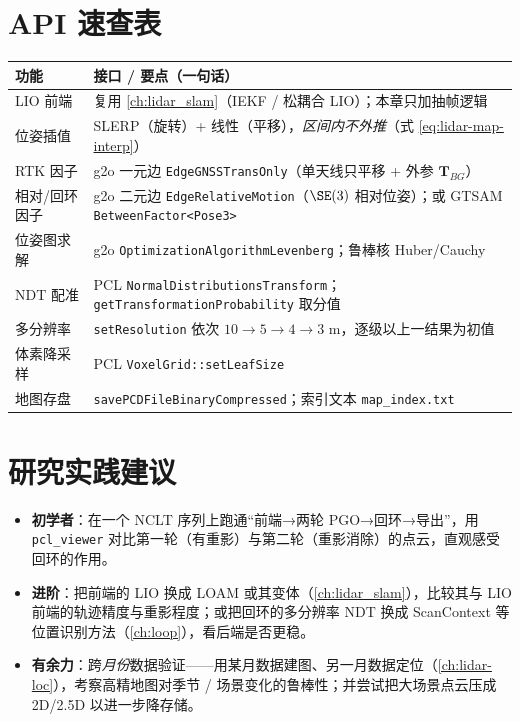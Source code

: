 \section*{API 速查表}
\begin{table}[H]\centering\small
\begin{tabular}{p{} p{}}
\toprule
功能 & 接口 / 要点（一句话） \\
\midrule
LIO 前端 & 复用 \cref{ch:lidar_slam}（IEKF / 松耦合 LIO）；本章只加抽帧逻辑 \\
位姿插值 & SLERP（旋转）+ 线性（平移），\emph{区间内不外推}（式 \ref{eq:lidar-map-interp}）\\
RTK 因子 & g2o 一元边 \texttt{EdgeGNSSTransOnly}（单天线只平移 + 外参 $\mathbf{T}_{BG}$）\\
相对/回环因子 & g2o 二元边 \texttt{EdgeRelativeMotion}（$\SE(3)$ 相对位姿）；或 GTSAM \texttt{BetweenFactor<Pose3>} \\
位姿图求解 & g2o \texttt{OptimizationAlgorithmLevenberg}；鲁棒核 Huber/Cauchy \\
NDT 配准 & PCL \texttt{NormalDistributionsTransform}；\texttt{getTransformationProbability} 取分值 \\
多分辨率 & \texttt{setResolution} 依次 $10\to5\to4\to3$ m，逐级以上一结果为初值 \\
体素降采样 & PCL \texttt{VoxelGrid::setLeafSize} \\
地图存盘 & \texttt{savePCDFileBinaryCompressed}；索引文本 \texttt{map\_index.\allowbreak txt} \\
\bottomrule
\end{tabular}
\end{table}

\section*{研究实践建议}
\begin{itemize}
  \item \textbf{初学者}：在一个 NCLT 序列上跑通“前端→两轮 PGO→回环→导出”，用 \texttt{pcl\_viewer} 对比第一轮（有重影）与第二轮（重影消除）的点云，直观感受回环的作用。
  \item \textbf{进阶}：把前端的 LIO 换成 LOAM 或其变体（\cref{ch:lidar_slam}），比较其与 LIO 前端的轨迹精度与重影程度；或把回环的多分辨率 NDT 换成 ScanContext\cite{kim2018scancontext} 等位置识别方法（\cref{ch:loop}），看后端是否更稳。
  \item \textbf{有余力}：跨\emph{月份}数据验证——用某月数据建图、另一月数据定位（\cref{ch:lidar-loc}），考察高精地图对季节 / 场景变化的鲁棒性；并尝试把大场景点云压成 2D/2.5D 以进一步降存储。
\end{itemize}

